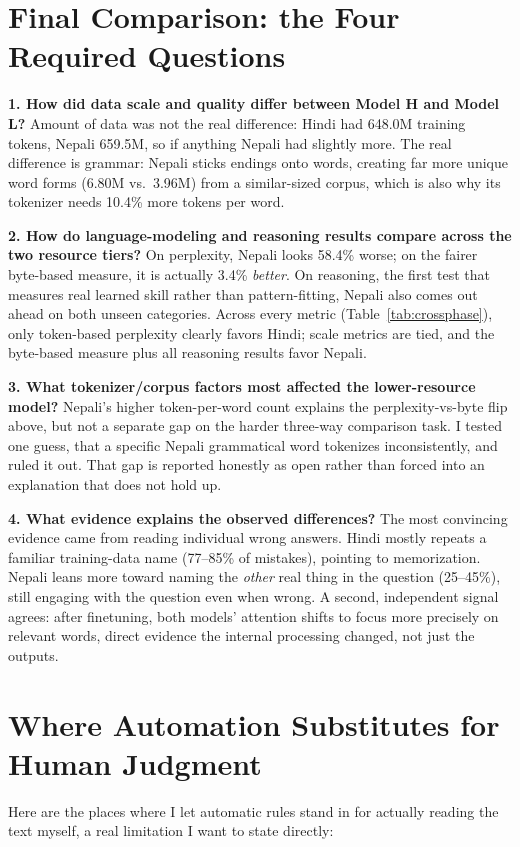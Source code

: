 \documentclass[11pt]{article}
\begin{document}
\section{Final Comparison: the Four Required Questions}
\label{sec:final-comparison}

\textbf{1. How did data scale and quality differ between Model H and Model L?} Amount of data was not the real difference: Hindi had 648.0M training tokens, Nepali 659.5M, so if anything Nepali had slightly more. The real difference is grammar: Nepali sticks endings onto words, creating far more unique word forms (6.80M vs.\ 3.96M) from a similar-sized corpus, which is also why its tokenizer needs 10.4\% more tokens per word.

\textbf{2. How do language-modeling and reasoning results compare across the two resource tiers?} On perplexity, Nepali looks 58.4\% worse; on the fairer byte-based measure, it is actually 3.4\% \emph{better}. On reasoning, the first test that measures real learned skill rather than pattern-fitting, Nepali also comes out ahead on both unseen categories. Across every metric (Table~\ref{tab:crossphase}), only token-based perplexity clearly favors Hindi; scale metrics are tied, and the byte-based measure plus all reasoning results favor Nepali.

\textbf{3. What tokenizer/corpus factors most affected the lower-resource model?} Nepali's higher token-per-word count explains the perplexity-vs-byte flip above, but not a separate gap on the harder three-way comparison task. I tested one guess, that a specific Nepali grammatical word tokenizes inconsistently, and ruled it out. That gap is reported honestly as open rather than forced into an explanation that does not hold up.

\textbf{4. What evidence explains the observed differences?} The most convincing evidence came from reading individual wrong answers. Hindi mostly repeats a familiar training-data name (77--85\% of mistakes), pointing to memorization. Nepali leans more toward naming the \emph{other} real thing in the question (25--45\%), still engaging with the question even when wrong. A second, independent signal agrees: after finetuning, both models' attention shifts to focus more precisely on relevant words, direct evidence the internal processing changed, not just the outputs.

\section{Where Automation Substitutes for Human Judgment}
Here are the places where I let automatic rules stand in for actually reading the text myself, a real limitation I want to state directly:
\end{document}
